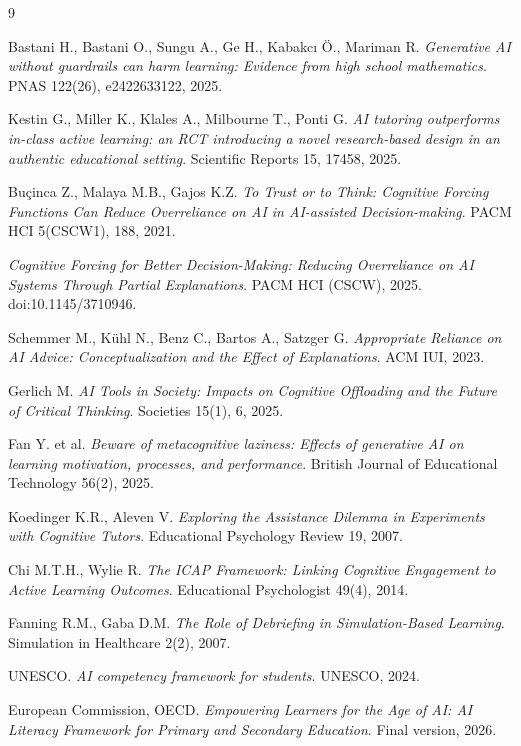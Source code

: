 \documentclass[12pt,a4paper]{article}
\begin{document}
\begin{thebibliography}{9}

 Bastani H., Bastani O., Sungu A., Ge H., Kabakc{\i} {\"O}., Mariman R. \textit{Generative AI without guardrails can harm learning: Evidence from high school mathematics}. PNAS 122(26), e2422633122, 2025.

 Kestin G., Miller K., Klales A., Milbourne T., Ponti G. \textit{AI tutoring outperforms in-class active learning: an RCT introducing a novel research-based design in an authentic educational setting}. Scientific Reports 15, 17458, 2025.

 Bu{\c{c}}inca Z., Malaya M.B., Gajos K.Z. \textit{To Trust or to Think: Cognitive Forcing Functions Can Reduce Overreliance on AI in AI-assisted Decision-making}. PACM HCI 5(CSCW1), 188, 2021.

 \textit{Cognitive Forcing for Better Decision-Making: Reducing Overreliance on AI Systems Through Partial Explanations}. PACM HCI (CSCW), 2025. doi:10.1145/3710946.

 Schemmer M., K{\"u}hl N., Benz C., Bartos A., Satzger G. \textit{Appropriate Reliance on AI Advice: Conceptualization and the Effect of Explanations}. ACM IUI, 2023.

 Gerlich M. \textit{AI Tools in Society: Impacts on Cognitive Offloading and the Future of Critical Thinking}. Societies 15(1), 6, 2025.

 Fan Y. et al. \textit{Beware of metacognitive laziness: Effects of generative AI on learning motivation, processes, and performance}. British Journal of Educational Technology 56(2), 2025.

 Koedinger K.R., Aleven V. \textit{Exploring the Assistance Dilemma in Experiments with Cognitive Tutors}. Educational Psychology Review 19, 2007.

 Chi M.T.H., Wylie R. \textit{The ICAP Framework: Linking Cognitive Engagement to Active Learning Outcomes}. Educational Psychologist 49(4), 2014.

 Fanning R.M., Gaba D.M. \textit{The Role of Debriefing in Simulation-Based Learning}. Simulation in Healthcare 2(2), 2007.

 UNESCO. \textit{AI competency framework for students}. UNESCO, 2024.

 European Commission, OECD. \textit{Empowering Learners for the Age of AI: AI Literacy Framework for Primary and Secondary Education}. Final version, 2026.

\end{thebibliography}
\end{document}
